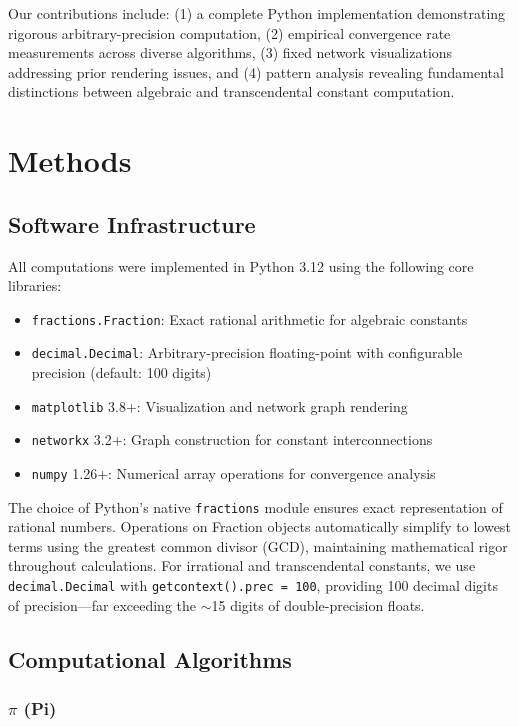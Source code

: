 \documentclass[11pt,a4paper]{article}
\begin{document}
Our contributions include: (1) a complete Python implementation demonstrating rigorous arbitrary-precision computation, (2) empirical convergence rate measurements across diverse algorithms, (3) fixed network visualizations addressing prior rendering issues, and (4) pattern analysis revealing fundamental distinctions between algebraic and transcendental constant computation.

\section{Methods}

\subsection{Software Infrastructure}

All computations were implemented in Python 3.12 using the following core libraries:

\begin{itemize}
    \item \texttt{fractions.Fraction}: Exact rational arithmetic for algebraic constants
    \item \texttt{decimal.Decimal}: Arbitrary-precision floating-point with configurable precision (default: 100 digits)
    \item \texttt{matplotlib} 3.8+: Visualization and network graph rendering
    \item \texttt{networkx} 3.2+: Graph construction for constant interconnections
    \item \texttt{numpy} 1.26+: Numerical array operations for convergence analysis
\end{itemize}

The choice of Python's native \texttt{fractions} module ensures exact representation of rational numbers. Operations on Fraction objects automatically simplify to lowest terms using the greatest common divisor (GCD), maintaining mathematical rigor throughout calculations. For irrational and transcendental constants, we use \texttt{decimal.Decimal} with \texttt{getcontext().prec = 100}, providing 100 decimal digits of precision—far exceeding the $\sim$15 digits of double-precision floats.

\subsection{Computational Algorithms}

\subsubsection{$\pi$ (Pi)}
\end{document}
